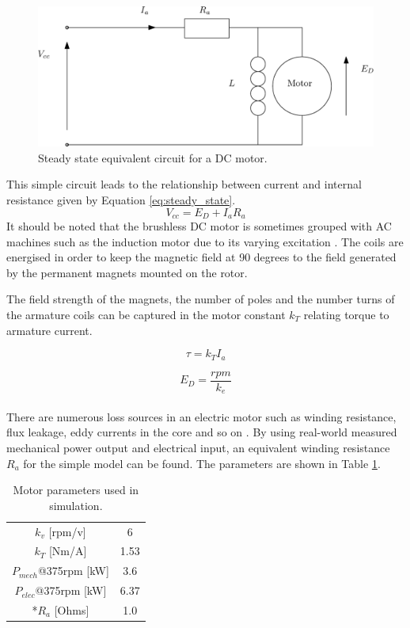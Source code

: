 \documentclass[]{article}
\begin{document}
\begin{figure}[ht]
	\centering
	\includegraphics[width=0.9\linewidth]{dc_circuit.eps}
	\caption{Steady state equivalent circuit for a DC motor.}
	\label{fig:dc_circuit}
\end{figure}

This simple circuit leads to the relationship between current and internal resistance given by Equation \ref{eq:steady_state}.
\begin{equation}
	V_{cc} = E_D + I_a R_a
	\label{eq:steady_state}
\end{equation} 
It should be noted that the brushless DC motor is sometimes grouped with AC machines such as the induction motor due to its varying excitation \cite{Sarlioglu2016}. The coils are energised in order to keep the magnetic field at 90 degrees to the field generated by the permanent magnets mounted on the rotor. 

The field strength of the magnets, the number of poles and the number turns of the armature coils can be captured in the motor constant $k_T $ relating torque to armature current.

\begin{equation}
	\tau = k_T I_a
	\label{eq:torque_constant}
\end{equation} 

\begin{equation}
	E_D = \frac{rpm}{k_e}
	\label{eq:emf_constant}
\end{equation} \\

There are numerous loss sources in an electric motor such as winding resistance, flux leakage, eddy currents in the core and so on \cite{Sarlioglu2016}. By using real-world measured mechanical power output and electrical input, an equivalent winding resistance $R_a$ for the simple model can be found. The parameters are shown in Table \ref{tab:motor_params}. 

\begin{table}
	\caption{Motor parameters used in simulation.}
	\label{tab:motor_params} 
	\centering
	\begin{tabular}{ |c|c| }
		\hline
		$k_v$ [rpm/v]& 6 \\ 
		$k_T$ [Nm/A] & 1.53 \\ 
		$P_{mech}$@375rpm [kW] & 3.6 \\ 
		$P_{elec}$@375rpm [kW]& 6.37 \\
		*$R_a$ [Ohms] & 1.0 \\
		\hline
	\end{tabular}
\end{table}
\end{document}
